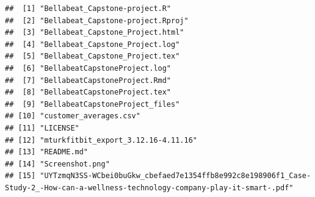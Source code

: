 \documentclass[
]{article}
\begin{document}
\begin{verbatim}
##  [1] "Bellabeat_Capstone-project.R"                                                                                                  
##  [2] "Bellabeat_Capstone-project.Rproj"                                                                                              
##  [3] "Bellabeat_Capstone_Project.html"                                                                                               
##  [4] "Bellabeat_Capstone_Project.log"                                                                                                
##  [5] "Bellabeat_Capstone_Project.tex"                                                                                                
##  [6] "BellabeatCapstoneProject.log"                                                                                                  
##  [7] "BellabeatCapstoneProject.Rmd"                                                                                                  
##  [8] "BellabeatCapstoneProject.tex"                                                                                                  
##  [9] "BellabeatCapstoneProject_files"                                                                                                
## [10] "customer_averages.csv"                                                                                                         
## [11] "LICENSE"                                                                                                                       
## [12] "mturkfitbit_export_3.12.16-4.11.16"                                                                                            
## [13] "README.md"                                                                                                                     
## [14] "Screenshot.png"                                                                                                                
## [15] "UYTzmqN3SS-WCbei0buGkw_cbefaed7e1354ffb8e992c8e198906f1_Case-Study-2_-How-can-a-wellness-technology-company-play-it-smart-.pdf"
\end{verbatim}
\end{document}
